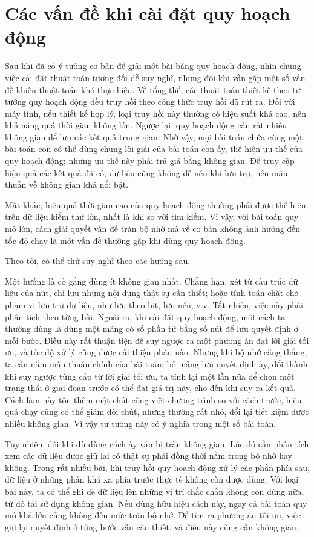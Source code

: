\documentclass[11pt]{article}
\begin{document}
\section{Các vấn đề khi cài đặt quy hoạch động}

Sau khi đã có ý tưởng cơ bản để giải một bài bằng quy hoạch động, nhìn chung
việc cài đặt thuật toán tương đối dễ suy nghĩ, nhưng đôi khi vẫn gặp một số
vấn đề khiến thuật toán khó thực hiện. Về tổng thể, các thuật toán thiết kế
theo tư tưởng quy hoạch động đều truy hồi theo công thức truy hồi đã rút ra.
Đối với máy tính, nếu thiết kế hợp lý, loại truy hồi này thường có hiệu suất
khá cao, nên khả năng quá thời gian không lớn. Ngược lại, quy hoạch động cần
rất nhiều không gian để lưu các kết quả trung gian. Nhờ vậy, mọi bài toán chứa
cùng một bài toán con có thể dùng chung lời giải của bài toán con ấy, thể hiện
ưu thế của quy hoạch động; nhưng ưu thế này phải trả giá bằng không gian. Để
truy cập hiệu quả các kết quả đã có, dữ liệu cũng không dễ nén khi lưu trữ,
nên mâu thuẫn về không gian khá nổi bật.

Mặt khác, hiệu quả thời gian cao của quy hoạch động thường phải được thể hiện
trên dữ liệu kiểm thử lớn, nhất là khi so với tìm kiếm. Vì vậy, với bài toán
quy mô lớn, cách giải quyết vấn đề tràn bộ nhớ mà về cơ bản không ảnh hưởng
đến tốc độ chạy là một vấn đề thường gặp khi dùng quy hoạch động.

Theo tôi, có thể thử suy nghĩ theo các hướng sau.

Một hướng là cố gắng dùng ít không gian nhất. Chẳng hạn, xét từ cấu trúc dữ
liệu của nút, chỉ lưu những nội dung thật sự cần thiết; hoặc tính toán chặt
chẽ phạm vi lưu trữ dữ liệu, như lưu theo bit, lưu nén, v.v. Tất nhiên, việc
này phải phân tích theo từng bài. Ngoài ra, khi cài đặt quy hoạch động, một
cách ta thường dùng là dùng một mảng có số phần tử bằng số nút để lưu quyết
định ở mỗi bước. Điều này rất thuận tiện để suy ngược ra một phương án đạt lời
giải tối ưu, và tốc độ xử lý cũng được cải thiện phần nào. Nhưng khi bộ nhớ
căng thẳng, ta cần nắm mâu thuẫn chính của bài toán: bỏ mảng lưu quyết định
ấy, đổi thành khi suy ngược từng cấp từ lời giải tối ưu, ta tính lại một lần
nữa để chọn một trạng thái ở giai đoạn trước có thể đạt giá trị này, cho đến
khi suy ra kết quả. Cách làm này tốn thêm một chút công viết chương trình so
với cách trước, hiệu quả chạy cũng có thể giảm đôi chút, nhưng thường rất
nhỏ, đổi lại tiết kiệm được nhiều không gian. Vì vậy tư tưởng này có ý nghĩa
trong một số bài toán.

Tuy nhiên, đôi khi dù dùng cách ấy vẫn bị tràn không gian. Lúc đó cần phân
tích xem các dữ liệu được giữ lại có thật sự phải đồng thời nằm trong bộ nhớ
hay không. Trong rất nhiều bài, khi truy hồi quy hoạch động xử lý các phần
phía sau, dữ liệu ở những phần khá xa phía trước thực tế không còn được dùng.
Với loại bài này, ta có thể ghi đè dữ liệu lên những vị trí chắc chắn không
còn dùng nữa, từ đó tái sử dụng không gian. Nếu dùng hữu hiệu cách này, ngay
cả bài toán quy mô khá lớn cũng không đến mức tràn bộ nhớ. Để tìm ra phương
án tối ưu, việc giữ lại quyết định ở từng bước vẫn cần thiết, và điều này
cũng cần không gian.
\end{document}
